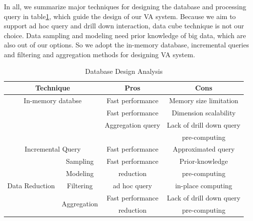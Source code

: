 \documentclass[journal]{vgtc}                %
\begin{document}
{In all, we summarize major techniques for designing the database and processing query in table\ref{tab:database}, which guide the design of our VA system. Because we aim to support ad hoc query and drill down interaction, data cube technique is not our choice. Data sampling and modeling need prior knowledge of big data, which are also out of our options. So we adopt the in-memory database, incremental queries and filtering and aggregation methods for designing VA system. 




\begin{table}[ht]
	\small
	\caption{Database Design Analysis}
	\begin{center}
		\begin{tabular}{|cc|c|c|}
			\hline
			\multicolumn{2}{|c|}{\textbf{Technique}} & \textbf{Pros} & \textbf{Cons} \\
			\hline
				\multicolumn{2}{|c|}{In-memory databse} & Fast performance & Memory size limitation\\
			\hline
			
		  	\multicolumn{2}{|c|}{	\multirow{3}{*}{Data cube} }& Fast performance  & Dimension scalability\\
			& & Aggregation query  & Lack of drill down query \\
			& & & pre-computing\\
			\hline
			
			
				
			\multicolumn{2}{|c|}{Incremental Query} & Fast performance & Approximated query\\
			\hline

			
			 \multicolumn{1}{|c|}{\multirow{5}{*}{Data Reduction}}& Sampling & Fast performance  & Prior-knowledge\\ 
			& \multicolumn{1}{|c|}{Modeling}  & reduction & pre-computing \\  
				\cline{2-4}
			& \multicolumn{1}{|c|}{Filtering} & ad hoc query & in-place computing\\ 
			\cline{2-4}
					& \multicolumn{1}{|c|}{\multirow{2}{*}{Aggregation}} & Fast performance & Lack of drill down query\\
						& \multicolumn{1}{|c|}{} & reduction  & pre-computing\\
			\hline
			
			
			\hline
		\end{tabular}
	\end{center}
	\label{tab:database}
\end{table}


}
\end{document}
